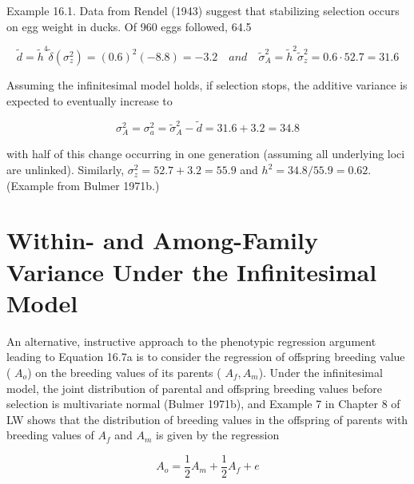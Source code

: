 \documentclass{article}
\begin{document}
Example 16.1. Data from Rendel (1943) suggest that stabilizing selection occurs on egg weight in ducks. Of 960 eggs followed, 64.5%

\begin{equation}
\widetilde{d}=\widetilde{h}^{4}\widetilde{\delta}(\sigma_{z}^{2})=(0.6)^{2}(-8.8)=-3.2\quad and\quad\widetilde{\sigma}_{A}^{2}=\widetilde{h}^{2}\widetilde{\sigma}_{z}^{2}=0.6\cdot52.7=31.6
\end{equation}

Assuming the infinitesimal model holds, if selection stops, the additive variance is expected to eventually increase to

\begin{equation}
\sigma_{A}^{2}=\sigma_{a}^{2}=\widetilde{\sigma}_{A}^{2}-\widetilde{d}=31.6+3.2=34.8
\end{equation}

with half of this change occurring in one generation (assuming all underlying loci are unlinked). Similarly,  $ \sigma_{z}^{2} = 52.7 + 3.2 = 55.9 $ and  $ h^{2} = 34.8/55.9 = 0.62 $. (Example from Bulmer 1971b.)

\section{Within- and Among-Family Variance Under the Infinitesimal Model}
An alternative, instructive approach to the phenotypic regression argument leading to Equation 16.7a is to consider the regression of offspring breeding value ( $ A_{o} $) on the breeding values of its parents ( $ A_{f}, A_{m} $). Under the infinitesimal model, the joint distribution of parental and offspring breeding values before selection is multivariate normal (Bulmer 1971b), and Example 7 in Chapter 8 of LW shows that the distribution of breeding values in the offspring of parents with breeding values of  $ A_{f} $ and  $ A_{m} $ is given by the regression

\begin{equation}
A_{o}=\frac{1}{2}A_{m}+\frac{1}{2}A_{f}+e
\tag{16.8a}
\label{eq:16_8a}
\end{equation}
\end{document}
